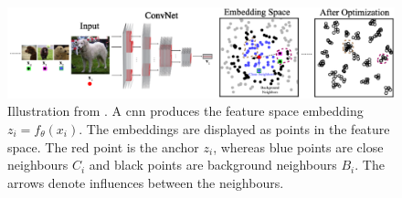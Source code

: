 \begin{figure}[!htb] %
    \centering
    \includegraphics[width=360pt]{images/la_neighbourhoods.png}
    \caption{Illustration from \citet{local_aggr_2019}.
    A \ac{cnn} produces the feature space embedding $z_i = f_\theta(x_i)$.
    The embeddings are displayed as points in the feature space.
    The red point is the anchor $z_i$, 
    whereas blue points are close neighbours $C_i$ and
    black points are background neighbours $B_i$.
    The arrows denote influences between the neighbours.}
    \label{fig:la_bi_ci}
\end{figure}